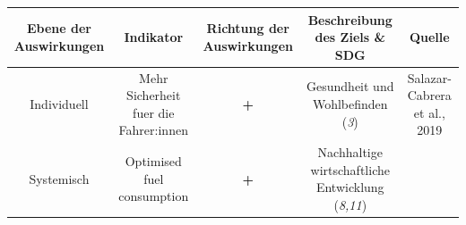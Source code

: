 \documentclass[
]{book}
\begin{document}
\begin{longtable}[]{@{}ccccc@{}}
\toprule
\begin{minipage}[b]{0.17\columnwidth}\centering
Ebene der Auswirkungen\strut
\end{minipage} & \begin{minipage}[b]{0.16\columnwidth}\centering
Indikator\strut
\end{minipage} & \begin{minipage}[b]{0.17\columnwidth}\centering
Richtung der Auswirkungen\strut
\end{minipage} & \begin{minipage}[b]{0.17\columnwidth}\centering
Beschreibung des Ziels \& SDG\strut
\end{minipage} & \begin{minipage}[b]{0.17\columnwidth}\centering
Quelle\strut
\end{minipage}\tabularnewline
\midrule
\endhead
\begin{minipage}[t]{0.17\columnwidth}\centering
Individuell\strut
\end{minipage} & \begin{minipage}[t]{0.16\columnwidth}\centering
Mehr Sicherheit fuer die Fahrer:innen\strut
\end{minipage} & \begin{minipage}[t]{0.17\columnwidth}\centering
\textbf{+}\strut
\end{minipage} & \begin{minipage}[t]{0.17\columnwidth}\centering
Gesundheit und Wohlbefinden (\emph{3})\strut
\end{minipage} & \begin{minipage}[t]{0.17\columnwidth}\centering
Salazar-Cabrera et al., 2019\strut
\end{minipage}\tabularnewline
\begin{minipage}[t]{0.17\columnwidth}\centering
Systemisch\strut
\end{minipage} & \begin{minipage}[t]{0.16\columnwidth}\centering
Optimised fuel consumption\strut
\end{minipage} & \begin{minipage}[t]{0.17\columnwidth}\centering
\textbf{+}\strut
\end{minipage} & \begin{minipage}[t]{0.17\columnwidth}\centering
Nachhaltige wirtschaftliche Entwicklung (\emph{8,11})\strut
\end{minipage} & \begin{minipage}[t]{0.17\columnwidth}\centering

\end{minipage}
\end{longtable}
\end{document}
